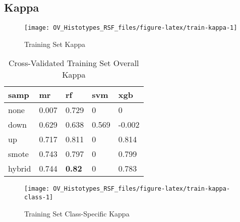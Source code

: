 \documentclass[
]{report}
\begin{document}
\hypertarget{kappa}{%
\subsection{Kappa}\label{kappa}}

\begin{figure}[H]

{\centering \texttt{[image: OV\_Histotypes\_RSF\_files/figure-latex/train-kappa-1]} 

}

\caption{Training Set Kappa}\label{fig:train-kappa}
\end{figure}

\begin{table}

\caption{\label{tab:train-kappa-table}Cross-Validated Training Set Overall Kappa}
\centering
\begin{tabular}[t]{l|l|l|l|l}
\hline
samp & mr & rf & svm & xgb\\
\hline
none & 0.007 & 0.729 & 0 & 0\\
\hline
down & 0.629 & 0.638 & 0.569 & -0.002\\
\hline
up & 0.717 & 0.811 & 0 & 0.814\\
\hline
smote & 0.743 & 0.797 & 0 & 0.799\\
\hline
hybrid & 0.744 & \textbf{0.82} & 0 & 0.783\\
\hline
\end{tabular}
\end{table}

\begin{figure}[H]

{\centering \texttt{[image: OV\_Histotypes\_RSF\_files/figure-latex/train-kappa-class-1]} 

}

\caption{Training Set Class-Specific Kappa}\label{fig:train-kappa-class}
\end{figure}
\end{document}
